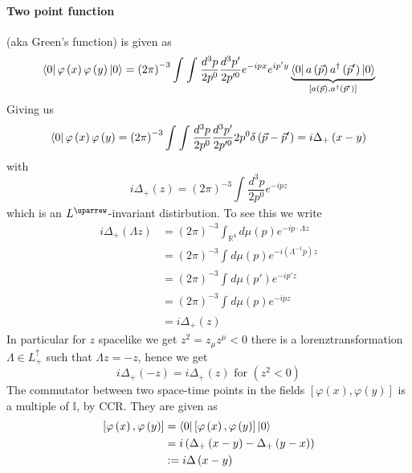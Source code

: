 \documentclass{report}
\begin{document}
\paragraph{Two point function} (aka Green's function) is given as
\[
\bra{0} \varphi\left( x \right) \varphi\left( y \right) \ket{0} 
= \left( 2\pi \right) ^{-3} \int_{}^{} \int_{}^{} \frac{d^3p}{2p^{0} } \frac{d^3p'}{2p'^{0} } e^{-ipx} e^{ip'y} \underbrace{ \bra{0} a\left( \vec{p} \right) a^\dagger\left( \vec{p}' \right) \ket{0} }_{\left[ a\left( \vec{p} \right) , a^\dagger\left( \vec{p}' \right)  \right] } 
\] 
Giving us \[
\bra{0} \varphi\left( x \right) \varphi\left( y \right) 
= \left( 2\pi \right) ^{-3} \int_{}^{} \int_{}^{} \frac{d^3p}{2p^{0} } \frac{d^3p'}{2p'^{0} } 2 p^{0} \delta \left( \vec{p} - \vec{p}' \right)   
= i \Delta_+\left( x-y \right) 
\] with \[
i \Delta_+\left( z \right) = \left( 2\pi \right) ^{-3} \int_{}^{} \frac{d^3p}{2p^{0} } e^{-ipz}  
\] which is an $L^{\uparrew} $-invariant distirbution. To see this we write
\begin{align*}
  i\Delta_+\left( \Lambda z \right) &= \left( 2\pi \right) ^{-3} \int_{\mathbb{R}^{4} }^{} d \mu\left( p \right) e^{-i p \cdot \Lambda z}  \\
  &= \left( 2\pi \right) ^{-3} \int_{}^{} d \mu\left( p \right) e^{-i \left( \Lambda^{-1} p \right) z}   \\
  &= \left( 2\pi \right) ^{-3} \int_{}^{} d \mu\left( p' \right) e^{-i p' z}   \\
  &= \left( 2\pi \right) ^{-3} \int_{}^{} d \mu\left( p \right) e^{-i p z}   \\
  &=  i \Delta_+\left( z \right) 
\end{align*}
In particular for $z$ spacelike we get $z^2 = z_\mu z^{\mu} < 0$ there is a lorenztransformation $\Lambda \in L^{\uparrow}_+$ such that $\Lambda z = -z$, hence we get \[
i\Delta_+\left( -z \right) = i \Delta_+\left( z \right)  \text{  for } \left( z^2 < 0 \right) 
\] 
The commutator between two space-time points in the fields $\left[ \varphi\left( x \right) , \varphi\left( y \right)  \right] $ is a multiple of $\mathbb{I}$, by CCR. They are given as
\begin{align*}
  \left[ \varphi\left( x \right) , \varphi\left( y \right)  \right] &= \bra{0} \left[ \varphi\left( x \right) , \varphi\left( y \right)  \right] \ket{0}  \\
  &= i\left( \Delta_{+} \left( x-y \right) - \Delta_+\left( y-x \right)  \right)  \\
  &:= i \Delta\left( x-y \right)
\end{align*}
\end{document}
